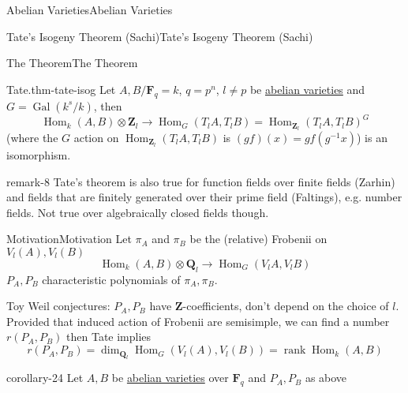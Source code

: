 \documentclass[10pt,]{book}
\numberwithin{equation}{section}
\newcommand{\ZZ}{\mathbf{Z}}
\newcommand{\QQ}{\mathbf{Q}}
\newcommand{\FF}{\mathbf{F}}
\DeclareMathOperator{\Hom}{Hom}
\DeclareMathOperator{\rank}{rank}
\newcommand{\Gal}[2]{\operatorname{Gal}(#1/#2)}
\begin{document}
\begin{chapterptx}{Abelian Varieties}{}{Abelian Varieties}{}{}
\begin{sectionptx}{Tate's Isogeny Theorem (Sachi)}{}{Tate's Isogeny Theorem (Sachi)}{}{}
%
%
\typeout{************************************************}
\typeout{************************************************}
%
\begin{subsectionptx}{The Theorem}{}{The Theorem}{}{}\label{subsection-31}
\begin{theorem}{Tate.}{}{thm-tate-isog}%
\hypertarget{p-376}{}%
Let \(A,B/\FF_q = k\), \(q = p^n\), \(l\ne p\) be \hyperref[def-buntes-abvar]{abelian varieties} and \(G = \Gal{k^s}{k}\), then%
\begin{equation*}
\Hom_{k}(A,B)\otimes \ZZ_l \to \Hom_G(T_l A, T_lB) = \Hom_{\ZZ_l}(T_lA,T_lB)^G
\end{equation*}
(where the \(G\) action on \(\Hom_{\ZZ_l}(T_l A, T_lB)\) is \((gf)(x) = gf(g^{-1}x)\)) is an isomorphism.%
\end{theorem}
\begin{remark}{}{remark-8}%
\hypertarget{p-377}{}%
Tate's theorem is also true for function fields over finite fields (Zarhin) and fields that are finitely generated over their prime field (Faltings), e.g. number fields. Not true over algebraically closed fields though.%
\end{remark}
\end{subsectionptx}
%
%
\typeout{************************************************}
\typeout{************************************************}
%
\begin{subsectionptx}{Motivation}{}{Motivation}{}{}\label{subsection-32}
\hypertarget{p-378}{}%
Let \(\pi_A\) and \(\pi_B\) be the (relative) Frobenii on \(V_l(A), V_l(B)\)%
\begin{equation*}
\Hom_{k}(A,B)\otimes \QQ_l \to \Hom_G(V_l A, V_lB)
\end{equation*}
\(P_A,P_B\) characteristic polynomials of \(\pi_A,\pi_B\).%
\par
\hypertarget{p-379}{}%
Toy Weil conjectures: \(P_A, P_B\) have \(\ZZ\)-coefficients, don't depend on the choice of \(l\). Provided that induced action of Frobenii are semisimple, we can find a number \(r(P_A,P_B)\) then Tate implies%
\begin{equation*}
r(P_A,P_B) = \dim_{\QQ_l} \Hom_G (V_l(A), V_l(B)) = \rank \Hom_k(A,B)
\end{equation*}
%
\begin{corollary}{}{}{corollary-24}%
\hypertarget{p-380}{}%
Let \(A, B\) be \hyperref[def-buntes-abvar]{abelian varieties} over \(\FF_q\) and \(P_A, P_B\) as above\leavevmode%
\begin{enumerate}

\end{enumerate}
\end{corollary}
\end{subsectionptx}
\end{sectionptx}
\end{chapterptx}
\end{document}
